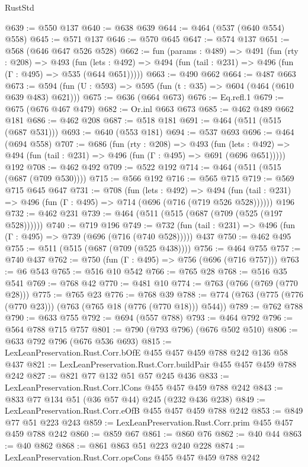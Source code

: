 \begin{lexlean}{RustStd}
\begin{coremodule}
@639 := @550 @137
@640 := @638 @639
@644 := @464 (@537 (@640 @554) @558)
@645 := @571 @137
@646 := @570 @645
@647 := @574 @137
@651 := @568 (@646 @647 @526 @528)
@662 := fun (params : @489) =>
  @491
    (fun (rty : @208) =>
    @493
      (fun (lets : @492) => @494 (fun (tail : @231) => @496 (fun (Γ : @495) => @535 (@644 @651)))))
@663 := @490 @662
@664 := @487 @663
@673 := @594 (fun (U : @593) => @595 (fun (t : @35) => @604 (@464 (@610 @639 @483) @621)))
@675 := @636 (@664 @673)
@676 := Eq.refl.{1}
@679 := @675 (@676 @467 @479)
@682 := Or.inl @663 @673
@685 := @462 @489 @662 @181
@686 := @462 @208
@687 := @518 @181
@691 := @464 (@511 (@515 (@687 @531)))
@693 := @640 (@553 @181)
@694 := @537 @693
@696 := @464 (@694 @558)
@707 := @686
    (fun (rty : @208) =>
    @493
      (fun (lets : @492) => @494 (fun (tail : @231) => @496 (fun (Γ : @495) => @691 (@696 @651)))))
    @192
@708 := @462 @492
@709 := @522 @192
@714 := @464 (@511 (@515 (@687 (@709 @530))))
@715 := @566 @192
@716 := @565 @715
@719 := @569 @715 @645 @647
@731 := @708
    (fun (lets : @492) =>
    @494 (fun (tail : @231) => @496 (fun (Γ : @495) => @714 (@696 (@716 (@719 @526 @528))))))
    @196
@732 := @462 @231
@739 := @464 (@511 (@515 (@687 (@709 (@525 (@197 @528))))))
@740 := @719 @196
@749 := @732 (fun (tail : @231) => @496 (fun (Γ : @495) => @739 (@696 (@716 (@740 @528))))) @437
@750 := @462 @495
@755 := @511 (@515 (@687 (@709 (@525 @438))))
@756 := @464 @755
@757 := @740 @437
@762 := @750 (fun (Γ : @495) => @756 (@696 (@716 @757)))
@763 := @6 @543
@765 := @516 @10 @542
@766 := @765 @28
@768 := @516 @35 @541
@769 := @768 @42
@770 := @481 @10
@774 := @763 (@766 (@769 (@770 @28)))
@775 := @765 @23
@776 := @768 @39
@788 := @774 (@763 (@775 (@776 (@770 @23))) (@763 (@765 @18 (@776 (@770 @18))) @544))
@789 := @762 @788
@790 := @633 @755
@792 := @694 (@557 @788)
@793 := @464 @792
@796 := @564 @788 @715 @757
@801 := @790 (@793 @796) (@676 @502 @510)
@806 := @633 @792 @796 (@676 @536 @693)
@815 := LexLeanPreservation.Rust.Corr.bOfE @455 @457 @459 @788 @242 @136 @58 @437
@821 := LexLeanPreservation.Rust.Corr.buildPair @455 @457 @459 @788 @242
@827 := @821 @77 @132 @51 @57 @245 @436
@833 := LexLeanPreservation.Rust.Corr.lCons @455 @457 @459 @788 @242
@843 := @833 @77 @134 @51 (@36 @57 @44) @245 (@232 @436 @238)
@849 := LexLeanPreservation.Rust.Corr.eOfB @455 @457 @459 @788 @242
@853 := @849 @77 @51 @223 @243
@859 := LexLeanPreservation.Rust.Corr.prim @455 @457 @459 @788 @242
@860 := @859 @67
@861 := @860 @76
@862 := @40 @44
@863 := @40 @862
@868 := @861 @863 @51 @223 @240 @228
@874 := LexLeanPreservation.Rust.Corr.opsCons @455 @457 @459 @788 @242

\end{coremodule}
\end{lexlean}
